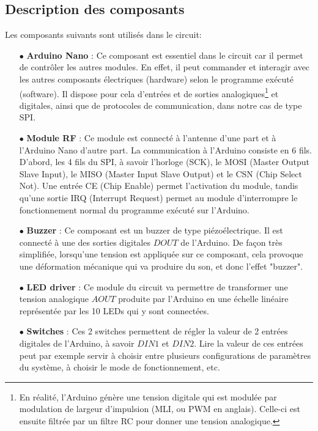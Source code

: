 \documentclass[a4paper,10pt,twoside]{article}
\begin{document}
\newpage

\subsection{Description des composants}
Les composants suivants sont utilisés dans le circuit:\\

\begin{itemize}
\item[$\bullet$] \textbf{Arduino Nano} : Ce composant est essentiel dans le circuit car il permet de contrôler les autres modules. En effet, il peut commander et interagir avec les autres composants électriques (hardware) selon le programme exécuté (software). Il dispose pour cela d'entrées et de sorties analogiques\footnote{En réalité, l'Arduino génère une tension digitale qui est modulée par modulation de largeur d'impulsion (MLI, ou PWM en anglais). Celle-ci est ensuite filtrée par un filtre RC pour donner une tension analogique.} et digitales, ainsi que de protocoles de communication, dans notre cas de type SPI.
\item[$\bullet$] \textbf{Module RF} : Ce module est connecté à l'antenne d'une part et à l'Arduino Nano d'autre part. La communication à l'Arduino consiste en 6 fils. D'abord, les 4 fils du SPI, à savoir l'horloge (SCK), le MOSI (Master Output Slave Input), le MISO (Master Input Slave Output) et le CSN (Chip Select Not). Une entrée CE (Chip Enable) permet l'activation du module, tandis qu'une sortie IRQ (Interrupt Request) permet au module d'interrompre le fonctionnement normal du programme exécuté sur l'Arduino.
\item[$\bullet$] \textbf{Buzzer} : Ce composant est un buzzer de type piézoélectrique. Il est connecté à une des sorties digitales $DOUT$ de l'Arduino. De façon très simplifiée, lorsqu'une tension est appliquée sur ce composant, cela provoque une déformation mécanique qui va produire du son, et donc l'effet "buzzer".
\item[$\bullet$] \textbf{LED driver} : Ce module du circuit va permettre de transformer une tension analogique $AOUT$ produite par l'Arduino en une échelle linéaire représentée par les 10 LEDs qui y sont connectées. 
\item[$\bullet$] \textbf{Switches} : Ces 2 switches permettent de régler la valeur de 2 entrées digitales de l'Arduino, à savoir $DIN1$ et $DIN2$. Lire la valeur de ces entrées peut par exemple servir à choisir entre plusieurs configurations de paramètres du système, à choisir le mode de fonctionnement, etc.\\
\end{itemize}
\end{document}
